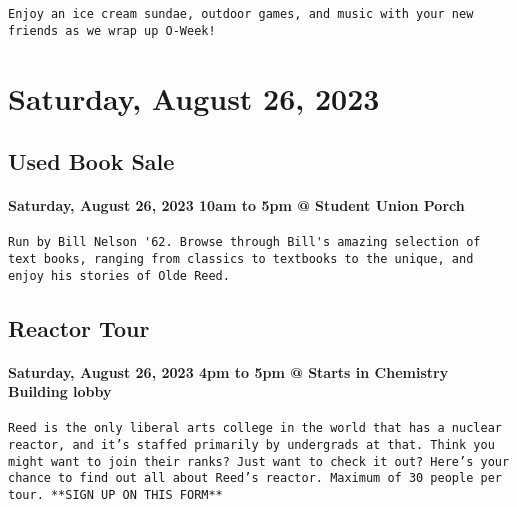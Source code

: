 \documentclass[
]{article}
\begin{document}
\begin{verbatim}
Enjoy an ice cream sundae, outdoor games, and music with your new friends as we wrap up O-Week!
\end{verbatim}

\hypertarget{saturday-august-26-2023}{%
\section{Saturday, August 26, 2023}\label{saturday-august-26-2023}}

\hypertarget{used-book-sale}{%
\subsection{Used Book Sale}\label{used-book-sale}}

\hypertarget{saturday-august-26-2023-10am-to-5pm-student-union-porch}{%
\paragraph{Saturday, August 26, 2023 10am to 5pm @ Student Union
Porch}\label{saturday-august-26-2023-10am-to-5pm-student-union-porch}}

\begin{verbatim}
Run by Bill Nelson '62. Browse through Bill's amazing selection of text books, ranging from classics to textbooks to the unique, and enjoy his stories of Olde Reed.
\end{verbatim}

\hypertarget{reactor-tour-1}{%
\subsection{Reactor Tour}\label{reactor-tour-1}}

\hypertarget{saturday-august-26-2023-4pm-to-5pm-starts-in-chemistry-building-lobby}{%
\paragraph{Saturday, August 26, 2023 4pm to 5pm @ Starts in Chemistry
Building
lobby}\label{saturday-august-26-2023-4pm-to-5pm-starts-in-chemistry-building-lobby}}

\begin{verbatim}
Reed is the only liberal arts college in the world that has a nuclear reactor, and it’s staffed primarily by undergrads at that. Think you might want to join their ranks? Just want to check it out? Here’s your chance to find out all about Reed’s reactor. Maximum of 30 people per tour. **SIGN UP ON THIS FORM**
\end{verbatim}
\end{document}
